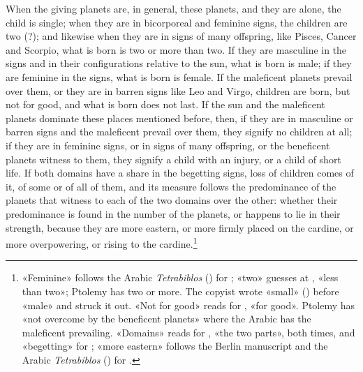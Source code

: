 \documentclass[11pt]{article}
\begin{document}
\par When the giving planets are, in general, these planets, and they are alone, the child is single; when they are in bicorporeal and feminine signs, the children are two (?); and likewise when they are in signs of many offspring, like Pisces, Cancer and Scorpio, what is born is two or more than two. If they are masculine in the signs and in their configurations relative to the sun, what is born is male; if they are feminine in the signs, what is born is female. If the maleficent planets prevail over them, or they are in barren signs like Leo and Virgo, children are born, but not for good, and what is born does not last. If the sun and the maleficent planets dominate these places mentioned before, then, if they are in masculine or barren signs and the maleficent prevail over them, they signify no children at all; if they are in feminine signs, or in signs of many offspring, or the beneficent planets witness to them, they signify a child with an injury, or a child of short life. If both domains have a share in the begetting signs, loss of children comes of it, of some or of all of them, and its measure follows the predominance of the planets that witness to each of the two domains over the other: whether their predominance is found in the number of the planets, or happens to lie in their strength, because they are more eastern, or more firmly placed on the cardine, or more overpowering, or rising to the cardine.\footnote{«Feminine» follows the Arabic \emph{Tetrabiblos} () for ; «two» guesses at , «less than two»; Ptolemy has two or more. The copyist wrote «small» () before «male» and struck it out. «Not for good» reads  for , «for good». Ptolemy has «not overcome by the beneficent planets» where the Arabic has the maleficent prevailing. «Domains» reads  for , «the two parts», both times, and «begetting»  for ; «more eastern» follows the Berlin manuscript and the Arabic \emph{Tetrabiblos} () for .}\par
\end{document}
